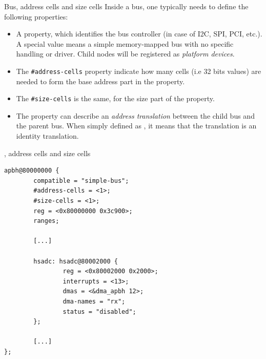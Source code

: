 \documentclass[obeyspaces,spaces,hyphens]{beamer}
\begin{document}
\begin{frame}{Bus, address cells and size cells}
  Inside a bus, one typically needs to define the following
  properties:
  \begin{itemize}
  \item A  property, which identifies the bus
    controller (in case of I2C, SPI, PCI, etc.). A special value
     means a simple memory-mapped bus
    with no specific handling or driver. Child nodes will be
    registered as {\em platform devices}.
  \item The { {\tt \#address-cells}} property
    indicate how many cells (i.e 32 bits values) are needed to form
    the base address part in the  property.
  \item The { {\tt \#size-cells}} is the
    same, for the size part of the  property.
  \item The  property can describe an {\em address
      translation} between the child bus and the parent bus. When
    simply defined as , it means that the translation is
    an identity translation.
  \end{itemize}
\end{frame}

\begin{frame}[fragile]{, address cells and size cells}
  \begin{block}{}
\begin{verbatim}
apbh@80000000 {
        compatible = "simple-bus";
        #address-cells = <1>;
        #size-cells = <1>;
        reg = <0x80000000 0x3c900>;
        ranges;

        [...]

        hsadc: hsadc@80002000 {
                reg = <0x80002000 0x2000>;
                interrupts = <13>;
                dmas = <&dma_apbh 12>;
                dma-names = "rx";
                status = "disabled";
        };

        [...]
};
\end{verbatim}
\end{block}
\end{frame}
\end{document}
